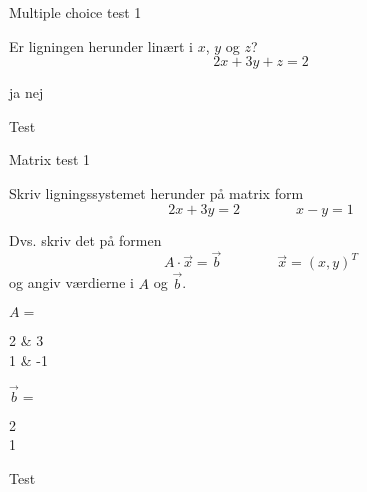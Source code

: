 \documentclass{article}
\begin{document}

\tableofcontents
\newpage

\begin{exercise}{Multiple choice test 1}

Er ligningen herunder linært i $x$, $y$ og $z$?
\[
2x + 3y + z = 2
\]

\begin{multichoice}
\itemtrue ja
\itemfalse nej
\end{multichoice}

\hint
Test

\end{exercise}


\begin{exercise}{Matrix test 1}

Skriv ligningssystemet herunder på matrix form
\[
2x + 3y = 2 \qquad \qquad
x - y = 1
\]

Dvs. skriv det på formen
\[
A \cdot \vec{x} = \vec{b} \qquad \qquad \vec{x} = (x, y)^T
\]
og angiv værdierne i \(A\) og \(\vec{b}\).

\( A = \)
\begin{answermatrix}
2 & 3 \\
1 & -1
\end{answermatrix}


\( \vec{b} = \)
\begin{answermatrix}
2 \\
1
\end{answermatrix}

\hint
Test
\end{exercise}
\end{document}
